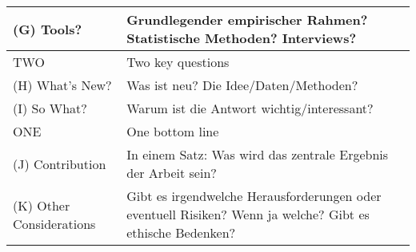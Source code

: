 \documentclass[10pt,table]{article}
\providecommand{\lgc}{\cellcolor{lightgray}}
\begin{document}
\begin{center}
\begin{longtable}{p{4.5cm}p{4cm}p{2.5cm}p{4cm}p{2.5cm}p{3.5cm}}
\lgc (G) Tools? & \multicolumn{5}{p{18cm}}{Grundlegender empirischer Rahmen? Statistische Methoden? Interviews?} \\[1ex]
\midrule
\lgc  TWO & \multicolumn{5}{p{18cm}}{\lgc Two key questions} \\
\midrule
\lgc (H) What’s New?& \multicolumn{5}{p{18cm}}{Was ist neu? Die Idee/Daten/Methoden? } \\[1ex]
\lgc (I) So What? & \multicolumn{5}{p{18cm}}{Warum ist die Antwort wichtig/interessant?} \\[1ex]
\midrule
\lgc ONE & \multicolumn{5}{p{18cm}}{\lgc One bottom line} \\
\midrule
\lgc  (J) Contribution& \multicolumn{5}{p{18cm}}{In einem Satz: Was wird das zentrale Ergebnis der Arbeit sein?} \\[1ex]
 \lgc (K) Other Considerations& \multicolumn{5}{p{18cm}}{Gibt es irgendwelche Herausforderungen oder eventuell Risiken? Wenn ja welche? Gibt es ethische Bedenken?} \\[1ex]
\bottomrule   
\end{longtable}
\end{center}
\end{document}
